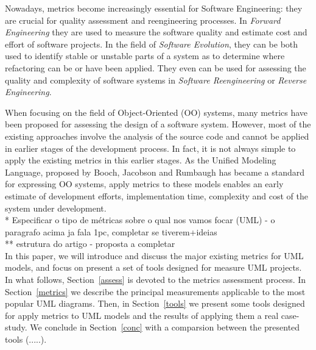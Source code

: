     
Nowadays, metrics become increasingly essential for Software Engineering: they are crucial for quality assessment and reengineering processes.
In \emph{Forward Engineering} they are used to measure the software quality and estimate cost and effort of software projects\cite{Fenton}.
In the field of \emph{Software Evolution}, they can be both used to identify stable or unstable parts of a system as to determine where refactoring can be or have been applied\cite{Serge}.
They even can be used for assessing the quality and complexity of software systems in \emph{Software Reengineering} or \emph{Reverse Engineering}\cite{43044}.

When focusing on the field of Object-Oriented (OO) systems, many metrics have been proposed for assessing the design of a software system.
However, most of the existing approaches involve the analysis of the source code and cannot be applied in earlier stages of the development process.
In fact, it is not always simple to apply the existing metrics in this earlier stages. 
As the \textsf{Unified Modeling Language}, proposed by Booch, Jacobson and Rumbaugh\cite{USDPuml} has became a standard for expressing OO systems, apply metrics to these models enables an early estimate of development efforts, implementation time, complexity and cost of the system under development. \\

  * Especificar o tipo de métricas sobre o qual nos vamos focar (UML) - o paragrafo acima ja fala 1pc, completar se tiverem+ideias\\
  
  ** estrutura do artigo - proposta a completar\\
  
In this paper, we will introduce and discuss the major existing metrics for UML models, and focus on present a set of tools designed for measure UML projects.
In what follows, Section~\ref{assess} is devoted to the metrics assessment process.
In Section~\ref{metrics} we describe the principal measurements applicable to the most popular UML diagrams.
Then, in Section~\ref{tools} we present some tools designed for apply metrics to UML models and the results of applying them a real case-study.
We conclude in Section~\ref{conc} with a comparsion between the presented tools (.....).
  
    


